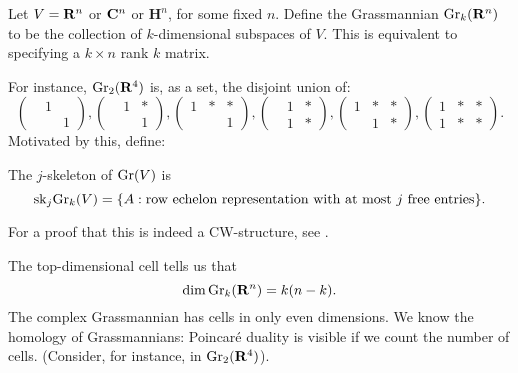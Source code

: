 \begin{example}[Grassmannians]
    Let $V=\mathbf R^n$ or $\mathbf C^n$ or $\mathbf{H}^n$, for some fixed $n$.
    Define the Grassmannian $\mathrm{Gr}_k(\mathbf R^n)$ to be the collection of $k$-dimensional subspaces of $V$.
    This is equivalent to specifying a $k\times n$ rank $k$ matrix.


    For instance, $\mathrm{Gr}_2(\mathbf R^4)$ is, as a set, the disjoint union of:
    \begin{equation*}
	\begin{pmatrix}& 1 & \\ & & 1\end{pmatrix},\begin{pmatrix}&1&\ast\\&&1\end{pmatrix},\begin{pmatrix}1&\ast&\ast\\&&1\end{pmatrix},\begin{pmatrix}&1&\ast\\&1&\ast\end{pmatrix},\begin{pmatrix}1&\ast&\ast\\&1&\ast\end{pmatrix},\begin{pmatrix}1&\ast&\ast\\1&\ast&\ast\end{pmatrix}.
    \end{equation*}
    Motivated by this, define:
    \begin{definition}
	The $j$-skeleton of $\mathrm{Gr}(V)$ is
	$$\mathrm{sk}_j\mathrm{Gr}_k(V) = \{A:\text{row echelon representation with at most $j$ free entries}\}.$$
    \end{definition}
    For a proof that this is indeed a CW-structure, see \cite[\S 6]{milnorstasheff}.
\end{example}
The top-dimensional cell tells us that
$$\dim\mathrm{Gr}_k(\mathbf R^n) = k(n-k).$$
The complex Grassmannian has cells in only even dimensions.
We know the homology of Grassmannians: Poincar\'e duality is visible if we count the number of cells.
(Consider, for instance, in $\mathrm{Gr}_2(\mathbf R^4)$).
